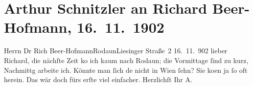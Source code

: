 

         
         \renewcommand{\erwaehntePersonen}{Personen: Richard Beer-Hofmann}
         \renewcommand{\erwaehnteOrte}{Orte: IX., Alsergrund, Liesingerstraße, Rodaun, Wien}
         \renewcommand{\erwaehnteWerke}{}
               \section[Arthur Schnitzler an Richard Beer-Hofmann, 16. 11. 1902]{ Arthur Schnitzler an Richard Beer-Hofmann, 16. 11. 1902}\nopagebreak{}\rehead{ }\begin{ledgroupsized}[t]{13cm}\normalsize\beginnumbering \toendnotes[C]{\smallbreak\pagebreak[2]} 
\pstart{}{\pb}Herrn Dr Rich Beer-Hofmann\pend{}\pstart{}Rodaun\pend{}\pstart{}Liesinger Straße 2\pend{}{\bigskip}\pstart
           \raggedleft{}{\pb}16. 11. 902\pend
           \pstart
           lieber Richard, die nächſte Zeit ko{\geminationm}
               ich kaum nach Rodaun; die Vormittage ſind zu
               kurz, Nachmittg arbeite ich. Könnte man ſich de{\geminationn} nicht
               in Wien ſehn? Sie ko{\geminationm}en ja ſo oft herein. Das wär doch fürs erſte viel einfacher. Herzlichſt\pend
           \pstart Ihr \spacefill\mbox{A.}\pend{}
         
         \endnumbering{}\end{ledgroupsized}  \newcommand{\dateiname}{L01248}\newcommand{\titel}{Arthur Schnitzler an Richard Beer-Hofmann, 16. 11. 1902}\newcommand{\editorInnen}{Martin Anton Müller und Gerd-Hermann Susen}
      